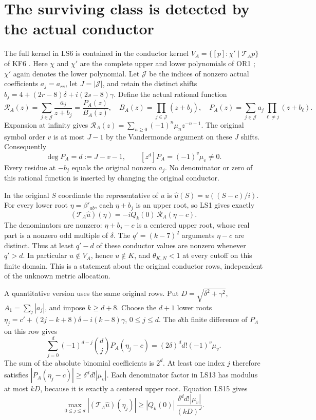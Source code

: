 \documentclass[11pt]{article}
\begin{document}
\section{The surviving class is detected by the actual conductor}
The full kernel in LS6 is contained in the conductor kernel
$V_A=\{[p]:\chi'\mid\mathcal T_Ap\}$ of KF6 \cite{KF}.
Here $\chi$ and $\chi'$ are the complete upper and lower polynomials
of OR1 \cite{OR}; $\chi'$ again denotes the lower polynomial.
Let $\mathcal J$ be the indices of nonzero actual coefficients
$a_j=a_{rs}$, let $J=|\mathcal J|$, and retain the distinct shifts
$b_j=4+(2r-8)\delta+i(2s-8)\gamma$.
Define the actual rational function
\[
\mathcal R_A(z)=\sum_{j\in\mathcal J}\frac{a_j}{z+b_j}
=\frac{P_A(z)}{B_A(z)},\quad
B_A(z)=\prod_{j\in\mathcal J}(z+b_j),\quad
P_A(z)=\sum_{j\in\mathcal J}a_j\prod_{\ell\ne j}(z+b_\ell).
\tag{LS13}
\]
Expansion at infinity gives
$\mathcal R_A(z)=\sum_{n\ge0}(-1)^n\mu_n z^{-n-1}$.
The original symbol order $v$ is at most $J-1$ by the
Vandermonde argument on these $J$ shifts. Consequently
\[
\deg P_A=d:=J-v-1,\qquad
[z^d]P_A=(-1)^v\mu_v\ne0 .
\tag{LS14}
\]
Every residue at $-b_j$ equals the original nonzero $a_j$.
No denominator or zero of this rational function is inserted
by changing the original conductor.

In the original $S$ coordinate the representative of $u$ is
$\widehat u(S)=u((S-c)/i)$. For every lower root $\eta=\beta'_{ab}$,
each $\eta+b_j$ is an upper root, so LS1 gives exactly
\[
(\mathcal T_A\widehat u)(\eta)
=-iQ_k(0)\,\mathcal R_A(\eta-c).
\tag{LS15}
\]
The denominators are nonzero: $\eta+b_j-c$ is a centered
upper root, whose real part is a nonzero odd multiple of $\delta$.
The $q'=(k-7)^2$ arguments $\eta-c$ are distinct. Thus at least
$q'-d$ of these conductor values are nonzero whenever $q'>d$.
In particular $u\notin V_A$, hence $u\notin K$, and
$\theta_{K,N}<1$ at every cutoff on this finite domain.
This is a statement about the original conductor rows, independent
of the unknown metric allocation.

A quantitative version uses the same original rows. Put
$D=\sqrt{\delta^2+\gamma^2}$, $A_1=\sum_j|a_j|$, and impose
$k\ge d+8$. Choose the $d+1$ lower roots
$\eta_j=c'+(2j-k+8)\delta-i(k-8)\gamma$, $0\le j\le d$.
The $d$th finite difference of $P_A$ on this row gives
\[
\sum_{j=0}^d(-1)^{d-j}\binom dj P_A(\eta_j-c)
=(2\delta)^d d!(-1)^v\mu_v.
\]
The sum of the absolute binomial coefficients is $2^d$.
At least one index $j$ therefore satisfies
$|P_A(\eta_j-c)|\ge\delta^d d!|\mu_v|$.
Each denominator factor in LS13 has modulus at most $kD$,
because it is exactly a centered upper root. Equation LS15 gives
\[
\max_{0\le j\le d}|(\mathcal T_A\widehat u)(\eta_j)|
\ge |Q_k(0)|\,\frac{\delta^d d!|\mu_v|}{(kD)^J}.
\tag{LS16}
\]
\end{document}

